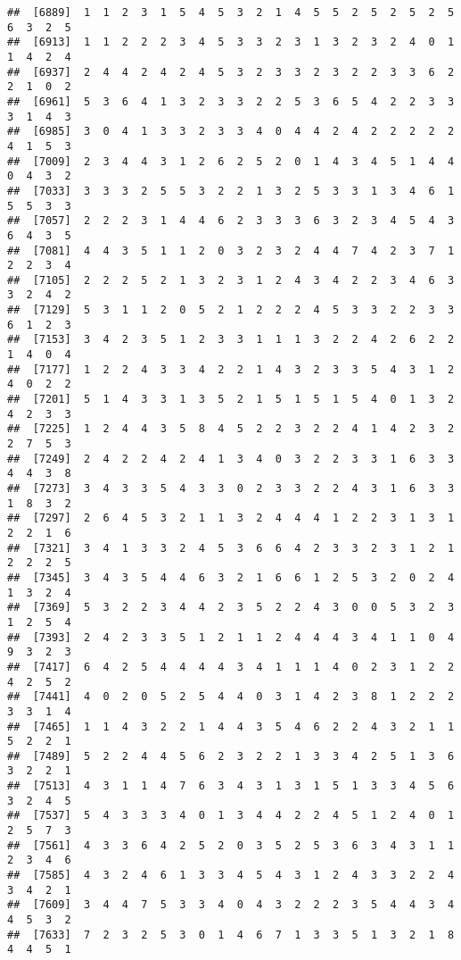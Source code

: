 \documentclass[
]{article}
\begin{document}
\begin{verbatim}
##  [6889]  1  1  2  3  1  5  4  5  3  2  1  4  5  5  2  5  2  5  2  5  6  3  2  5
##  [6913]  1  1  2  2  2  3  4  5  3  3  2  3  1  3  2  3  2  4  0  1  1  4  2  4
##  [6937]  2  4  4  2  4  2  4  5  3  2  3  3  2  3  2  2  3  3  6  2  2  1  0  2
##  [6961]  5  3  6  4  1  3  2  3  3  2  2  5  3  6  5  4  2  2  3  3  3  1  4  3
##  [6985]  3  0  4  1  3  3  2  3  3  4  0  4  4  2  4  2  2  2  2  2  4  1  5  3
##  [7009]  2  3  4  4  3  1  2  6  2  5  2  0  1  4  3  4  5  1  4  4  0  4  3  2
##  [7033]  3  3  3  2  5  5  3  2  2  1  3  2  5  3  3  1  3  4  6  1  5  5  3  3
##  [7057]  2  2  2  3  1  4  4  6  2  3  3  3  6  3  2  3  4  5  4  3  6  4  3  5
##  [7081]  4  4  3  5  1  1  2  0  3  2  3  2  4  4  7  4  2  3  7  1  2  2  3  4
##  [7105]  2  2  2  5  2  1  3  2  3  1  2  4  3  4  2  2  3  4  6  3  3  2  4  2
##  [7129]  5  3  1  1  2  0  5  2  1  2  2  2  4  5  3  3  2  2  3  3  6  1  2  3
##  [7153]  3  4  2  3  5  1  2  3  3  1  1  1  3  2  2  4  2  6  2  2  1  4  0  4
##  [7177]  1  2  2  4  3  3  4  2  2  1  4  3  2  3  3  5  4  3  1  2  4  0  2  2
##  [7201]  5  1  4  3  3  1  3  5  2  1  5  1  5  1  5  4  0  1  3  2  4  2  3  3
##  [7225]  1  2  4  4  3  5  8  4  5  2  2  3  2  2  4  1  4  2  3  2  2  7  5  3
##  [7249]  2  4  2  2  4  2  4  1  3  4  0  3  2  2  3  3  1  6  3  3  4  4  3  8
##  [7273]  3  4  3  3  5  4  3  3  0  2  3  3  2  2  4  3  1  6  3  3  1  8  3  2
##  [7297]  2  6  4  5  3  2  1  1  3  2  4  4  4  1  2  2  3  1  3  1  2  2  1  6
##  [7321]  3  4  1  3  3  2  4  5  3  6  6  4  2  3  3  2  3  1  2  1  2  2  2  5
##  [7345]  3  4  3  5  4  4  6  3  2  1  6  6  1  2  5  3  2  0  2  4  1  3  2  4
##  [7369]  5  3  2  2  3  4  4  2  3  5  2  2  4  3  0  0  5  3  2  3  1  2  5  4
##  [7393]  2  4  2  3  3  5  1  2  1  1  2  4  4  4  3  4  1  1  0  4  9  3  2  3
##  [7417]  6  4  2  5  4  4  4  4  3  4  1  1  1  4  0  2  3  1  2  2  4  2  5  2
##  [7441]  4  0  2  0  5  2  5  4  4  0  3  1  4  2  3  8  1  2  2  2  3  3  1  4
##  [7465]  1  1  4  3  2  2  1  4  4  3  5  4  6  2  2  4  3  2  1  1  5  2  2  1
##  [7489]  5  2  2  4  4  5  6  2  3  2  2  1  3  3  4  2  5  1  3  6  3  2  2  1
##  [7513]  4  3  1  1  4  7  6  3  4  3  1  3  1  5  1  3  3  4  5  6  3  2  4  5
##  [7537]  5  4  3  3  3  4  0  1  3  4  4  2  2  4  5  1  2  4  0  1  2  5  7  3
##  [7561]  4  3  3  6  4  2  5  2  0  3  5  2  5  3  6  3  4  3  1  1  2  3  4  6
##  [7585]  4  3  2  4  6  1  3  3  4  5  4  3  1  2  4  3  3  2  2  4  3  4  2  1
##  [7609]  3  4  4  7  5  3  3  4  0  4  3  2  2  2  3  5  4  4  3  4  4  5  3  2
##  [7633]  7  2  3  2  5  3  0  1  4  6  7  1  3  3  5  1  3  2  1  8  4  4  5  1

\end{verbatim}
\end{document}
